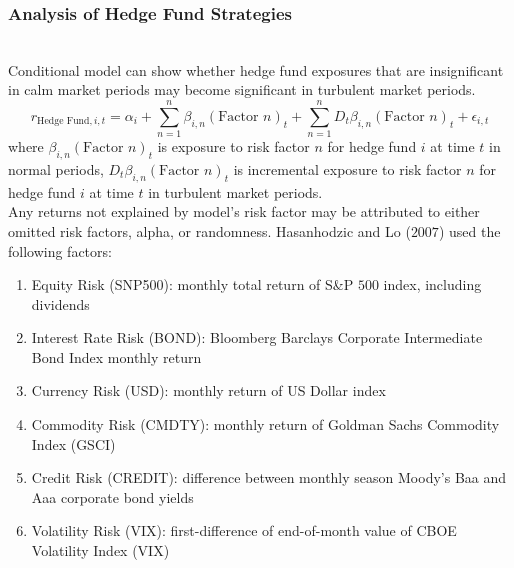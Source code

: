 \subsubsection{Analysis of Hedge Fund Strategies}

\begin{remark} \\
Conditional model can show whether hedge fund exposures that are insignificant in calm market periods may become significant in turbulent market periods.
\begin{equation}
r_{\text{Hedge Fund}, i, t} = \alpha_i + \sum\limits_{n=1}^n \beta_{i,n} (\text{Factor } n)_t +  \sum\limits_{n=1}^n D_t \beta_{i,n} (\text{Factor } n)_t + \epsilon_{i,t} \nonumber
\end{equation}
where $\beta_{i,n} (\text{Factor } n)_t$ is exposure to risk factor $n$ for hedge fund $i$ at time $t$ in normal periods, $D_t \beta_{i,n} (\text{Factor } n)_t$ is incremental exposure to risk factor $n$ for hedge fund $i$ at time $t$ in turbulent market periods.\\
Any returns not explained by model's risk factor may be attributed to either omitted risk factors, alpha, or randomness. Hasanhodzic and Lo ($2007$) used the following factors:
\begin{enumerate}[label=\roman*.]
\setlength{\itemsep}{0pt}
\item Equity Risk (SNP500): monthly total return of S\&P $500$ index, including dividends
\item Interest Rate Risk (BOND): Bloomberg Barclays Corporate Intermediate Bond Index monthly return
\item Currency Risk (USD): monthly return of US Dollar index
\item Commodity Risk (CMDTY): monthly return of Goldman Sachs Commodity Index (GSCI)
\item Credit Risk (CREDIT): difference between monthly season Moody's Baa and Aaa corporate bond yields
\item Volatility Risk (VIX): first-difference of end-of-month value of CBOE Volatility Index (VIX)
\end{enumerate}
\end{remark}

